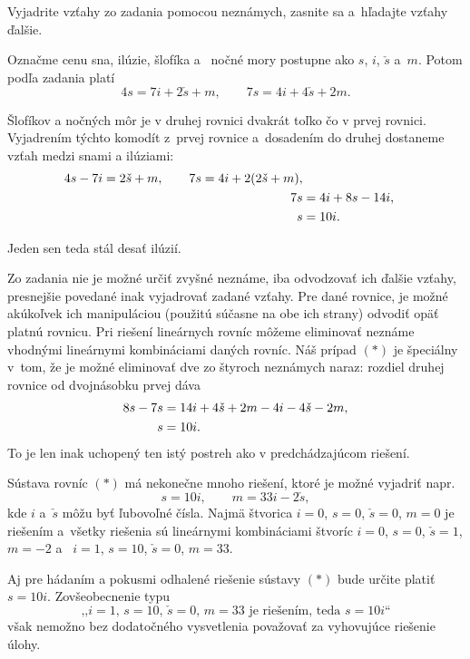 {%
\napad
Vyjadrite vzťahy zo zadania pomocou neznámych, zasnite sa a~hľadajte vzťahy ďalšie.

\res
Označme cenu sna, ilúzie, šlofíka a ~nočné mory postupne ako $s$, $i$, $\check s$
a~$m$.
Potom podľa zadania platí
$$
4s=7i+2\check s+m, \qquad
7s = 4i + 4 \check s + 2m. \tag{$*$}
$$

Šlofíkov a nočných môr je v druhej rovnici dvakrát toľko čo v prvej rovnici.
Vyjadrením týchto komodít z~prvej rovnice a~dosadením do druhej dostaneme vzťah medzi snami a ilúziami:
$$\aligned
4s-7i = 2\check s + m, \qquad 7s = 4i+2(2\check s+m), \\
7s &=4i +8s-14i, \\
s &=10i.
\endaligned
$$

Jeden sen teda stál desať ilúzií.

\poznamky
Zo zadania nie je možné určiť zvyšné neznáme, iba odvodzovať ich ďalšie vzťahy, presnejšie povedané inak vyjadrovať zadané vzťahy.
Pre dané rovnice, je možné akúkoľvek ich manipuláciou (použitú súčasne na obe ich strany) odvodiť opäť platnú rovnicu.
Pri riešení lineárnych rovníc môžeme eliminovať neznáme vhodnými lineárnymi kombináciami daných rovníc.
Náš prípad $(*)$ je špeciálny v~tom, že je možné eliminovať dve zo štyroch neznámych naraz:
rozdiel druhej rovnice od dvojnásobku prvej dáva
$$\aligned
8s-7s &=14i+4\check s +2m-4i-4\check s-2m, \\
s &=10i.
\endaligned
$$
To je len inak uchopený ten istý postreh ako v predchádzajúcom riešení.

Sústava rovníc $(*)$ má nekonečne mnoho riešení, ktoré je možné vyjadriť napr.
$$
s=10i,\qquad
m=33i-2\check s,
$$
kde $i$ a~$\check s$ môžu byť ľubovoľné čísla.
Najmä štvorica $i=0$, $s=0$, $\check s=0$, $m=0$ je riešením a~všetky riešenia sú lineárnymi kombináciami štvoríc $i=0$, $s=0$, $ \check s=1$, $m=-2$ a ~$i=1$, $s=10$, $\check s=0$, $m=33$.

Aj pre hádaním a pokusmi odhalené riešenie sústavy $(*)$ bude určite platiť $s=10i$.
Zovšeobecnenie typu
$$
\text{,,$i=1$, $s=10$, $\check s=0$, $m=33$ je riešením, teda $s=10i$``}
$$
však nemožno bez dodatočného vysvetlenia považovať za vyhovujúce riešenie úlohy.}

